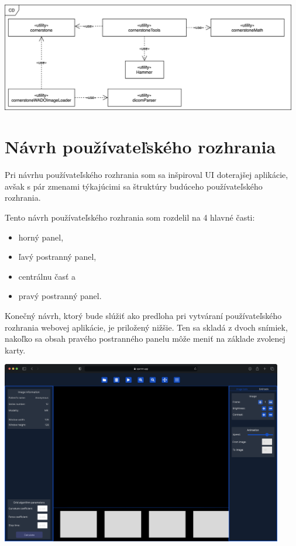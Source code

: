 \begin {center}
        \centering
        \includegraphics[height=4.75cm]{media/graphs/class_diagram.png}
        \captionsetup{justification=centering}
\end {center}

\section {Návrh používateľského rozhrania}
Pri návrhu používateľského rozhrania som sa inšpiroval UI doterajšej aplikácie, avšak s pár zmenami týkajúcimi sa štruktúry budúceho používateľského rozhrania.

Tento návrh používateľského rozhrania som rozdelil na 4 hlavné časti:
\begin {itemize}
\item {horný panel,}
\item {ľavý postranný panel,}
\item {centrálnu časť a}
\item {pravý postranný panel.}
\end {itemize}

Konečný návrh, ktorý bude slúžiť ako predloha pri vytváraní používateľského rozhrania webovej aplikácie, je priložený nižšie. Ten sa skladá z dvoch snímiek, nakoľko sa obsah pravého postranného panelu môže meniť na základe zvolenej karty.

\begin {center}
\centering
\includegraphics[height=8cm]{media/wireframes/1.png}
\captionsetup{justification=centering}
\end {center}


